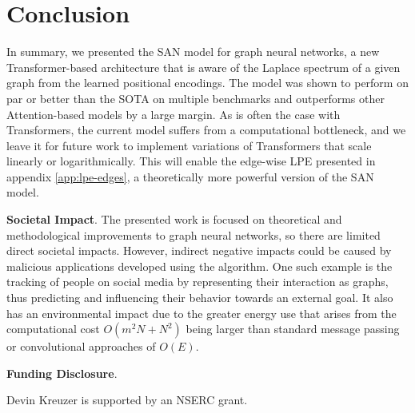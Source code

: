 \documentclass{article}
\newcommand{\xhdr}[1]{{\noindent\bfseries #1}.}
\begin{document}
\section{Conclusion}

In summary, we presented the SAN model for graph neural networks, a new Transformer-based architecture that is aware of the Laplace spectrum of a given graph from the learned positional encodings.
The model was shown to perform on par or better than the SOTA on multiple benchmarks and outperforms other Attention-based models by a large margin.
As is often the case with Transformers, the current model suffers from a computational bottleneck, and we leave it for future work to implement variations of Transformers that scale linearly or logarithmically. This will enable the edge-wise LPE presented in appendix \ref{app:lpe-edges}, a theoretically more powerful version of the SAN model.

\xhdr{Societal Impact} The presented work is focused on theoretical and methodological improvements to graph neural networks, so there are limited direct societal impacts. However, indirect negative impacts could be caused by malicious applications developed using the algorithm. One such example is the tracking of people on social media by representing their interaction as graphs, thus predicting and influencing their behavior towards an external goal. It also has an environmental impact due to the greater energy use that arises from the computational cost $O(m^2 N + N^2)$ being larger than standard message passing or convolutional approaches of $O(E)$.

\xhdr{Funding Disclosure}

Devin Kreuzer is supported by an NSERC grant.









\end{document}
